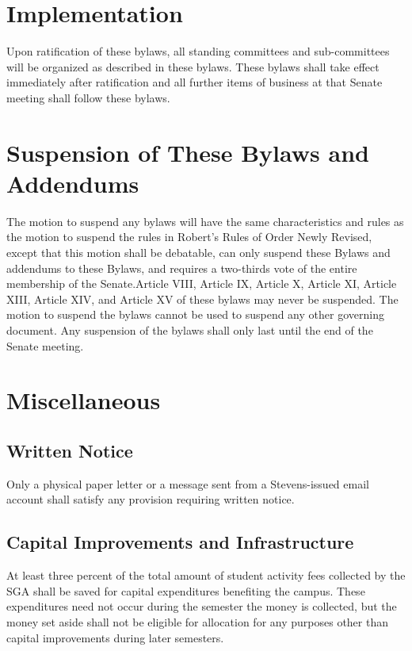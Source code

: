 \documentclass[12pt]{scrreprt}
\begin{document}
\chapter{Implementation}
Upon ratification of these bylaws, all standing committees and sub-committees 
will be organized as described in these bylaws. These bylaws shall take effect 
immediately after ratification and all further items of business at that 
Senate meeting shall follow these bylaws. 

\chapter{Suspension of These Bylaws and Addendums} \label{sec:suspension}
The motion to suspend any bylaws will have the same characteristics and rules as the motion to
suspend the rules in Robert’s Rules of Order Newly Revised, except that this motion shall be
debatable, can only suspend these Bylaws and addendums to these Bylaws, and requires a two-thirds
vote of the entire membership of the Senate.Article VIII, Article IX, Article X, Article XI, Article XIII, Article XIV, and
Article XV of these bylaws may never be suspended. The motion to suspend the bylaws cannot be
used to suspend any other governing document. Any suspension of the bylaws shall only last until
the end of the Senate meeting. 

\chapter{Miscellaneous}

\section{Written Notice}
Only a physical paper letter or a message sent from a Stevens-issued email account shall satisfy any provision
requiring written notice.

\section{Capital Improvements and Infrastructure}
At least three percent of the total amount of student activity fees collected 
by the SGA shall be saved for capital expenditures benefiting the campus. 
These expenditures need not occur during the semester the money is collected, 
but the money set aside shall not be eligible for allocation for any purposes 
other than capital improvements during later semesters. 
\end{document}
